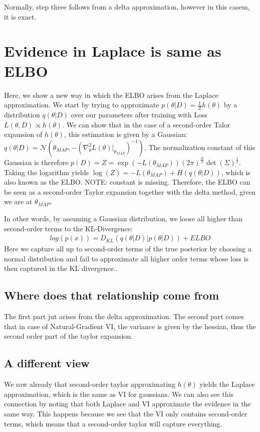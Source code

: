 \documentclass[a4paper]{scrartcl}
\begin{document}
    Normally, step three follows from a delta approximation, however in this casem, it is exact.
      
\section{Evidence in Laplace is same as ELBO}

Here, we show a new way in which the ELBO arises from the Laplace
approximation. We start by trying to approximate $p(\theta \vert D)
= \frac{1}{Z}h(\theta)$ by a distribution $q(\theta \vert D)$ over
our parameters after training with Loss $L(\theta, D) \propto
h(\theta)$. We can show that in the case of a second-order Talor
expansion of $h(\theta)$, this estimation is given by a Gaussian:
$q(\theta \vert D) = \mathcal{N}(\theta_{MAP}, -(\nabla^2_\theta
L(\theta)\vert_{\theta_{MAP}})^{-1})$. The normalization constant of
this Gaussian is therefore $p(D) = Z =
\exp(-L(\theta_{MAP}))(2\pi)^{\frac{D}{2}}
\det(\Sigma)^{\frac{1}{2}}$. Taking the logarithm yields $\log(Z) =
-L(\theta_{MAP}) + H(q(\theta \vert D))$, which is also known as the
ELBO. NOTE: constant is missing. Therefore, the ELBO can be seen as a second-order Taylor
expansion together with the delta method, given we are at
$\theta_{MAP}$.


In other words, by assuming a Gaussian distribution, we loose all
higher than second-order terms to the KL-Divergence:
\begin{align*}
    log(p(x)) = D_{KL}(q(\theta \vert D) \vert p(\theta \vert D)) + ELBO
\end{align*}
Here we capture all up to second-order terms of the true posterior
by choosing a normal distribution and fail to approximate all higher
order terms whose loss is then captured in the KL divergence..

\subsection{Where does that relationship come from}
    The first part jut arises from the delta approximation. The
    second part comes that in case of Natural-Gradient VI, the
    variance is given by the hessian, thus the second order part of
    the taylor expansion.


\subsection{A different view}
We saw already that second-order taylor approximating $h(\theta)$
yields the Laplace approximation, which is the same as VI for
gaussians. We can also see this connection by noting that both
Laplace and VI approximate the evidence in the same way. This
happens because we see that the VI only contains second-order terms,
which means that a second-order taylor will capture everything.
\end{document}
